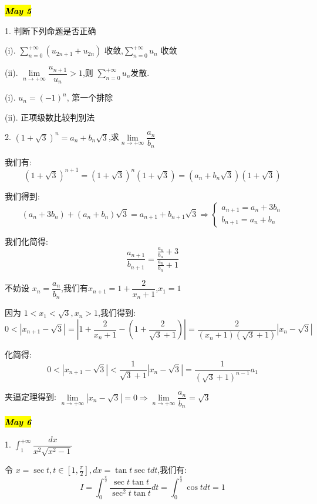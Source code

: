 
\hl{\textbf{\textit{May 5}}}

1. 判断下列命题是否正确 

(i). $\sum\limits_{n=0}^{+\infty}(u_{2n+1}+u_{2n})$ 收敛,$\sum\limits_{n=0}^{+\infty}u_{n}$ 收敛

(ii). $\lim\limits_{n\rightarrow +\infty}\dfrac{u_{n+1}}{u_{n}}>1$,则 $\sum\limits_{n=0}^{+\infty}u_{n}$发散.
\begin{solution}
	
	(i). $u_{n}=(-1)^{n}$, 第一个排除
	
	(ii). 正项级数比较判别法
\end{solution}


2. $(1+\sqrt{3})^{n}=a_{n}+b_{n}\sqrt{3}$,求$\lim\limits_{n\rightarrow +\infty}\dfrac{a_{n}}{b_{n}}$
\begin{solution}
	
	我们有: 
	$$(1+\sqrt{3})^{n+1}=(1+\sqrt{3})^{n}(1+\sqrt{3})=(a_{n}+b_{n}\sqrt{3})(1+\sqrt{3})$$
	
	我们得到: 
	$$(a_{n}+3b_{n})+(a_{n}+b_{n})\sqrt{3}=a_{n+1}+b_{n+1}\sqrt{3}\Rightarrow\left\lbrace\begin{array}{l}
		a_{n+1}=a_{n}+3b_{n}\\b_{n+1}=a_{n}+b_{n}
	\end{array} \right. $$
	
	我们化简得: 
	$$\frac{a_{n+1}}{b_{n+1}}=\frac{\frac{a_{n}}{b_{n}}+3}{\frac{a_{n}}{b_{n}}+1}$$
	
	不妨设 $x_{n}=\dfrac{a_{n}}{b_{n}}$,我们有$x_{n+1}=1+\dfrac{2}{x_{n}+1}$,$x_{1}=1$
	
	因为 $1<x_{1}<\sqrt{3},x_{n}>1$,我们得到: 
	$$0<|x_{n+1}-\sqrt{3}|=|1+\frac{2}{x_{n}+1}-(1+\frac{2}{\sqrt{3}+1})|=\frac{2}{(x_{n}+1)(\sqrt{3}+1)}|x_{n}-\sqrt{3}|$$
	
	化简得: 
	$$0<|x_{n+1}-\sqrt{3}|<\frac{1}{\sqrt{3}+1}|x_{n}-\sqrt{3}|=\frac{1}{(\sqrt{3}+1)^{n-1}}a_{1}$$
	
	夹逼定理得到: $\lim\limits_{n\rightarrow +\infty}|x_{n}-\sqrt{3}|=0\Rightarrow \lim\limits_{n\rightarrow +\infty}\dfrac{a_{n}}{b_{n}}=\sqrt{3}$
\end{solution}


\hl{\textbf{\textit{May 6}}}

1. $\int_{1}^{+\infty}\dfrac{dx}{x^2\sqrt{x^{2}-1}}$
\begin{solution}
	
	令 $x=\sec t,t\in [1,\frac{\pi}{2}], dx=\tan t\sec tdt$,我们有: 
	$$I=\int_{0}^{\frac{\pi}{2}}\frac{\sec t\tan t}{\sec^2 t\tan t}dt=\int_{0}^{\frac{\pi}{2}}\cos tdt=1$$
	
\end{solution}

